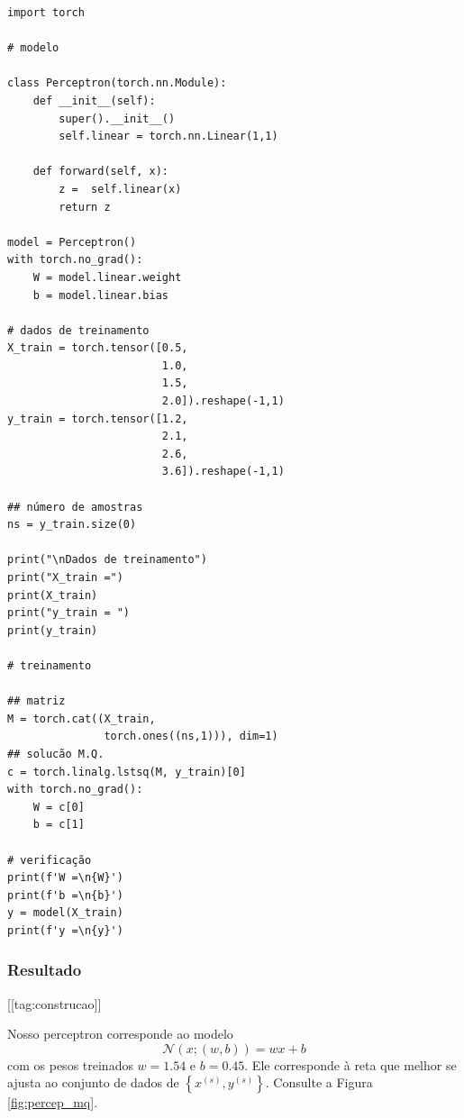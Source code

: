 \begin{lstlisting}[caption=perceptron\_mq.py, label=cap_perceptron_sec_unit:cod:perceptron_mq]
import torch

# modelo

class Perceptron(torch.nn.Module):
    def __init__(self):
        super().__init__()
        self.linear = torch.nn.Linear(1,1)

    def forward(self, x):
        z =  self.linear(x)
        return z

model = Perceptron()
with torch.no_grad():
    W = model.linear.weight
    b = model.linear.bias

# dados de treinamento
X_train = torch.tensor([0.5,
                        1.0,
                        1.5,
                        2.0]).reshape(-1,1)
y_train = torch.tensor([1.2,
                        2.1,
                        2.6,
                        3.6]).reshape(-1,1)

## número de amostras
ns = y_train.size(0)

print("\nDados de treinamento")
print("X_train =")
print(X_train)
print("y_train = ")
print(y_train)

# treinamento

## matriz
M = torch.cat((X_train,
               torch.ones((ns,1))), dim=1)
## solucão M.Q.
c = torch.linalg.lstsq(M, y_train)[0]
with torch.no_grad():
    W = c[0]
    b = c[1]

# verificação
print(f'W =\n{W}')
print(f'b =\n{b}')
y = model(X_train)
print(f'y =\n{y}')
\end{lstlisting}

\subsubsection{Resultado}
[[tag:construcao]]

Nosso perceptron corresponde ao modelo
\begin{equation}
  \mathcal{N}(x; (w,b)) = wx + b
\end{equation}
com os pesos treinados $w = 1.54$ e $b = 0.45$. Ele corresponde à reta que melhor se ajusta ao conjunto de dados de $\left\{x^{(s)}, y^{(s)}\right\}$. Consulte a Figura \ref{fig:percep_mq}.

